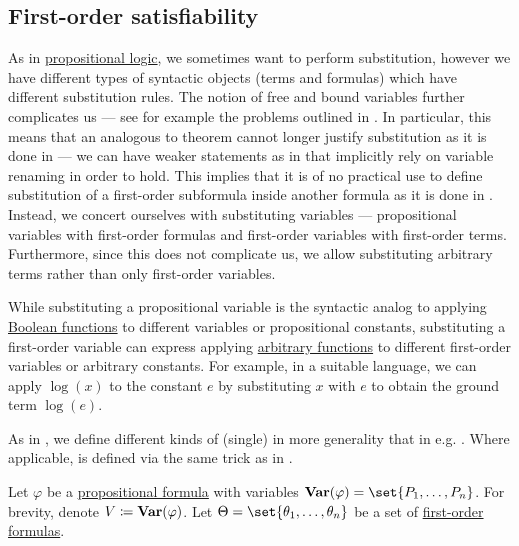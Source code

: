 \subsection{First-order satisfiability}\label{subsec:first_order_satisfiability}

\begin{definition}\label{def:first_order_substitution}
  As in \hyperref[subsec:propositional_logic]{propositional logic}, we sometimes want to perform substitution, however we have different types of syntactic objects (terms and formulas) which have different substitution rules. The notion of free and bound variables further complicates us --- see for example the problems outlined in . In particular, this means that an analogous to  theorem cannot longer justify substitution as it is done in  --- we can have weaker statements as in  that implicitly rely on variable renaming in order to hold. This implies that it is of no practical use to define substitution of a first-order subformula inside another formula as it is done in . Instead, we concert ourselves with substituting variables --- propositional variables with first-order formulas and first-order variables with first-order terms. Furthermore, since this does not complicate us, we allow substituting arbitrary terms rather than only first-order variables.

  While substituting a propositional variable is the syntactic analog to applying \hyperref[def:boolean_function]{Boolean functions} to different variables or propositional constants, substituting a first-order variable can express applying \hyperref[def:function]{arbitrary functions} to different first-order variables or arbitrary constants. For example, in a suitable language, we can apply \( \log(x) \) to the constant \( e \) by substituting \( x \) with \( e \) to obtain the ground term \( \log(e) \).

  As in , we define different kinds of (single)  in more generality that in e.g. \cite[def. 15.25]{OpenLogicFull}. Where applicable,  is defined via the same trick as in .

  \begin{thmenum}
     Let \( \varphi \) be a \hyperref[def:propositional_syntax/formula]{propositional formula} with variables \( \boldop{Var}(\varphi) = \set{ P_1, \ldots, P_n } \). For brevity, denote \( V \coloneqq \operatorname{\mathbf{Var}}(\varphi) \). Let \( \Theta = \set{ \theta_1, \ldots, \theta_n } \) be a set of \hyperref[def:first_order_syntax/formula]{first-order formulas}.


\end{thmenum}
\end{definition}
